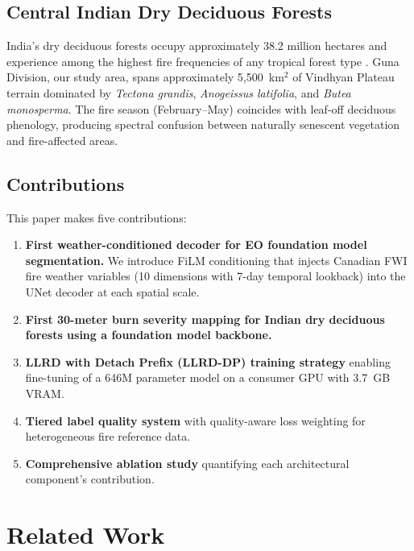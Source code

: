 \documentclass[review,12pt]{elsarticle}
\begin{document}
\subsection{Central Indian Dry Deciduous Forests}

India's dry deciduous forests occupy approximately 38.2 million hectares and experience among the highest fire frequencies of any tropical forest type \citep{fsi2023}. Guna Division, our study area, spans approximately 5,500~km$^2$ of Vindhyan Plateau terrain dominated by \textit{Tectona grandis}, \textit{Anogeissus latifolia}, and \textit{Butea monosperma}. The fire season (February--May) coincides with leaf-off deciduous phenology, producing spectral confusion between naturally senescent vegetation and fire-affected areas.

\subsection{Contributions}

This paper makes five contributions:

\begin{enumerate}
  \item \textbf{First weather-conditioned decoder for EO foundation model segmentation.} We introduce FiLM conditioning that injects Canadian FWI fire weather variables (10 dimensions with 7-day temporal lookback) into the UNet decoder at each spatial scale.
  \item \textbf{First 30-meter burn severity mapping for Indian dry deciduous forests using a foundation model backbone.}
  \item \textbf{LLRD with Detach Prefix (LLRD-DP) training strategy} enabling fine-tuning of a 646M parameter model on a consumer GPU with 3.7~GB VRAM.
  \item \textbf{Tiered label quality system} with quality-aware loss weighting for heterogeneous fire reference data.
  \item \textbf{Comprehensive ablation study} quantifying each architectural component's contribution.
\end{enumerate}


\section{Related Work}
\label{sec:related}
\end{document}
